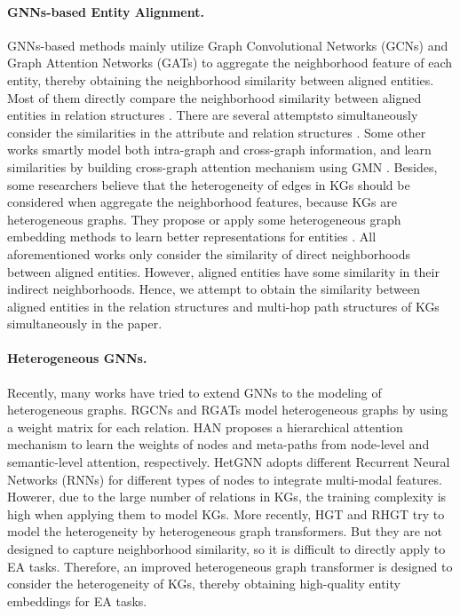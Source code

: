 \documentclass{article}
\begin{document}
\paragraph{GNNs-based Entity Alignment.}
GNNs-based methods mainly utilize Graph Convolutional Networks (GCNs) and Graph Attention Networks (GATs) to aggregate the neighborhood feature of each entity, thereby obtaining the neighborhood similarity between aligned entities.
Most of them directly compare the neighborhood similarity between aligned entities in relation structures \cite{wu_relation-aware_2019}.
There are several attemptsto simultaneously consider the similarities in the attribute and relation structures \cite{liu_exploring_2020}. %
Some other works smartly model both intra-graph and cross-graph information, and learn similarities by building cross-graph attention mechanism using GMN \cite{wu_neighborhood_2020,zhu_collective_2020}. %
Besides, some researchers believe that the heterogeneity of edges in KGs should be considered when aggregate the neighborhood features, because KGs are heterogeneous graphs.
They propose or apply some heterogeneous graph embedding methods to learn better representations for entities \cite{cai_multi-heterogeneous_2022}. %
%
All aforementioned works only consider the similarity of direct neighborhoods between aligned entities.
However, aligned entities have some similarity in their indirect neighborhoods.
Hence, we attempt to obtain the similarity between aligned entities in the relation structures and multi-hop path structures of KGs simultaneously in the paper.


\paragraph{Heterogeneous GNNs.}
Recently, many works have tried to extend GNNs to the modeling of heterogeneous graphs.
RGCNs \cite{schlichtkrull_modeling_2018} and RGATs \cite{busbridge_relational_2019} model heterogeneous graphs by using a weight matrix for each relation. 
HAN \cite{wang_heterogeneous_2019} proposes a hierarchical attention mechanism to learn the weights of nodes and meta-paths from node-level and semantic-level attention, respectively. 
HetGNN \cite{zhang_heterogeneous_2019} adopts different Recurrent Neural Networks (RNNs) for different types of nodes to integrate multi-modal features.
Howerer, due to the large number of relations in KGs, the training complexity is high when applying them to model KGs.
More recently, HGT \cite{hu_heterogeneous_2020} and RHGT \cite{mei_relation-aware_2022} try to model the heterogeneity by heterogeneous graph transformers.
But they are not designed to capture neighborhood similarity, so it is difficult to directly apply to EA tasks.
Therefore, an improved heterogeneous graph transformer is designed to consider the heterogeneity of KGs, thereby obtaining high-quality entity embeddings for EA tasks.
\end{document}
